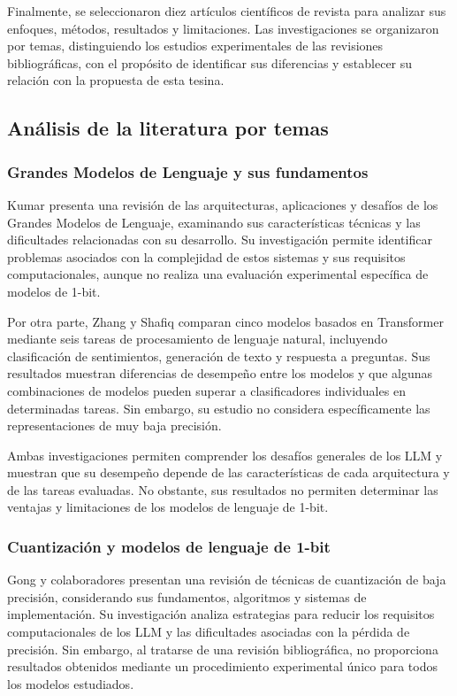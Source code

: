Finalmente, se seleccionaron diez artículos científicos de revista para analizar sus enfoques, métodos, resultados y limitaciones. Las investigaciones se organizaron por temas, distinguiendo los estudios experimentales de las revisiones bibliográficas, con el propósito de identificar sus diferencias y establecer su relación con la propuesta de esta tesina.


\subsection{Análisis de la literatura por temas}

\subsubsection{Grandes Modelos de Lenguaje y sus fundamentos}

Kumar \cite{llmSurvey2024} presenta una revisión de las arquitecturas, aplicaciones y desafíos de los Grandes Modelos de Lenguaje, examinando sus características técnicas y las dificultades relacionadas con su desarrollo. Su investigación permite identificar problemas asociados con la complejidad de estos sistemas y sus requisitos computacionales, aunque no realiza una evaluación experimental específica de modelos de 1-bit.

Por otra parte, Zhang y Shafiq \cite{transformerSurvey} comparan cinco modelos basados en Transformer mediante seis tareas de procesamiento de lenguaje natural, incluyendo clasificación de sentimientos, generación de texto y respuesta a preguntas. Sus resultados muestran diferencias de desempeño entre los modelos y que algunas combinaciones de modelos pueden superar a clasificadores individuales en determinadas tareas. Sin embargo, su estudio no considera específicamente las representaciones de muy baja precisión.

Ambas investigaciones permiten comprender los desafíos generales de los LLM y muestran que su desempeño depende de las características de cada arquitectura y de las tareas evaluadas. No obstante, sus resultados no permiten determinar las ventajas y limitaciones de los modelos de lenguaje de 1-bit.


\subsubsection{Cuantización y modelos de lenguaje de 1-bit}

Gong y colaboradores \cite{lowBitSurvey} presentan una revisión de técnicas de cuantización de baja precisión, considerando sus fundamentos, algoritmos y sistemas de implementación. Su investigación analiza estrategias para reducir los requisitos computacionales de los LLM y las dificultades asociadas con la pérdida de precisión. Sin embargo, al tratarse de una revisión bibliográfica, no proporciona resultados obtenidos mediante un procedimiento experimental único para todos los modelos estudiados.

